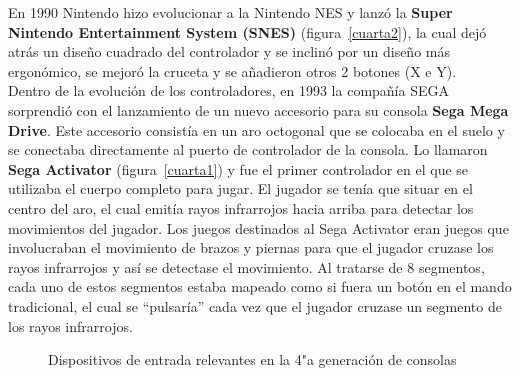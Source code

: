 En 1990 Nintendo hizo evolucionar a la Nintendo NES y lanz\'o la \textbf{Super Nintendo Entertainment System (SNES)} (figura~\ref{cuarta2}), la cual dej\'o atr\'as un dise\~no cuadrado del controlador y se inclin\'o por un dise\~no m\'as ergon\'omico, se mejor\'o la cruceta y se a\~nadieron otros 2 botones (X e Y). \\

Dentro de la evoluci\'on de los controladores, en 1993 la compa\~n\'ia SEGA sorprendi\'o con el lanzamiento de un nuevo accesorio para su consola \textbf{Sega Mega Drive}. Este accesorio consist\'ia en un aro octogonal que se colocaba en el suelo y se conectaba directamente al puerto de controlador de la consola. Lo llamaron \textbf{Sega Activator} (figura~\ref{cuarta1}) y fue el primer controlador en el que se utilizaba el cuerpo completo para jugar. El jugador se ten\'ia que situar en el centro del aro, el cual emit\'ia rayos infrarrojos hacia arriba para detectar los movimientos del jugador. Los juegos destinados al Sega Activator eran juegos que involucraban el movimiento de brazos y piernas para que el jugador cruzase los rayos infrarrojos y as\'i se detectase el movimiento. Al tratarse de 8 segmentos, cada uno de estos segmentos estaba mapeado como si fuera un bot\'on en el mando tradicional, el cual se ``pulsar\'ia'' cada vez que el jugador cruzase un segmento de los rayos infrarrojos. \\


\begin{figure}[t]
     \hfill
{}
     \hfill
     \caption{Dispositivos de entrada relevantes en la 4"a  generaci\'on de consolas}
     \label{fig:cuarta}
   \end{figure}

